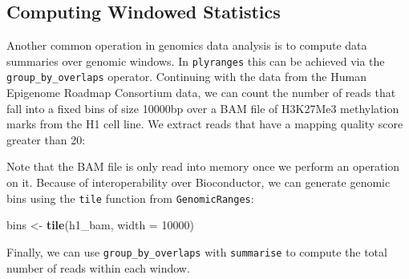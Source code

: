 \documentclass[10pt,letterpaper]{article}
\newenvironment{Shaded}{\begin{snugshade}}{\end{snugshade}}
\newcommand{\DataTypeTok}[1]{\textcolor[rgb]{0.13,0.29,0.53}{#1}}
\newcommand{\DecValTok}[1]{\textcolor[rgb]{0.00,0.00,0.81}{#1}}
\newcommand{\KeywordTok}[1]{\textcolor[rgb]{0.13,0.29,0.53}{\textbf{#1}}}
\newcommand{\NormalTok}[1]{#1}
\newcommand{\OperatorTok}[1]{\textcolor[rgb]{0.81,0.36,0.00}{\textbf{#1}}}
\newcommand{\StringTok}[1]{\textcolor[rgb]{0.31,0.60,0.02}{#1}}
\begin{document}
\hypertarget{computing-windowed-statistics}{%
\subsection{Computing Windowed
Statistics}\label{computing-windowed-statistics}}

Another common operation in genomics data analysis is to compute data
summaries over genomic windows. In \texttt{plyranges} this can be
achieved via the \texttt{group\_by\_overlaps} operator. Continuing with
the data from the Human Epigenome Roadmap Consortium data, we can count
the number of reads that fall into a fixed bins of size 10000bp over a
BAM file of H3K27Me3 methylation marks from the H1 cell line. We extract
reads that have a mapping quality score greater than 20:

\begin{Shaded}
\end{Shaded}

Note that the BAM file is only read into memory once we perform an
operation on it. Because of interoperability over Bioconductor, we can
generate genomic bins using the \texttt{tile} function from
\texttt{GenomicRanges}:

\begin{Shaded}
\begin{Highlighting}[]
\NormalTok{bins <-}\StringTok{ }\KeywordTok{tile}\NormalTok{(h1_bam, }\DataTypeTok{width =} \DecValTok{10000}\NormalTok{)}
\end{Highlighting}
\end{Shaded}

Finally, we can use \texttt{group\_by\_overlaps} with \texttt{summarise}
to compute the total number of reads within each window.

\begin{Shaded}
\end{Shaded}
\end{document}
